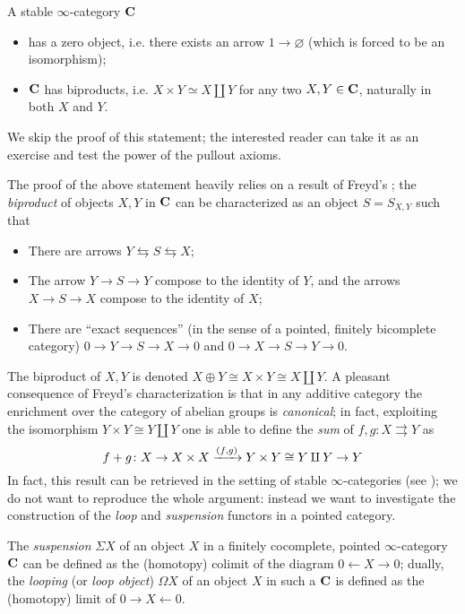 \begin{remark}
A stable $\infty$\hyp{}category $\mathbf{C}$
\begin{itemize}
\item has a zero object, i.e. there exists an arrow $1\to\varnothing$ (which is forced to be an isomorphism);
\item $\mathbf{C}$ has biproducts, i.e. $X\times Y\simeq X\amalg Y$ for any two $X,Y\in\mathbf{C}$, naturally in both $X$ and $Y$.
\end{itemize}
\end{remark}
We skip the proof of this statement; the interested reader can take it as an exercise and test the power of the pullout axioms.
\begin{remark}
The proof of the above statement heavily relies on a result of Freyd's \cite{freyd1964abelian}; the \emph{biproduct} of objects $X,Y$ in $\mathbf{C}$ can be characterized as an object $S = S_{X,Y}$ such that
\begin{itemize}
\item There are arrows $Y\leftrightarrows S\leftrightarrows X$;
\item The arrow $Y\to S\to Y$ compose to the identity of $Y$, and the arrows $X\to S\to X$ compose to the identity of $X$;
\item There are ``exact sequences'' (in the sense of a pointed, finitely bicomplete category) $0\to Y\to S\to X\to 0$ and $0\to X\to S\to Y\to 0$.
\end{itemize}
The biproduct of $X,Y$ is denoted $X\oplus Y\cong X\times Y\cong X\amalg Y$. A pleasant consequence of Freyd's characterization is that in any additive category the enrichment over the category of abelian groups is \emph{canonical}; in fact, exploiting the isomorphism $Y\times Y\cong Y\amalg Y$ one is able to define the \emph{sum} of $f,g\colon X\rightrightarrows Y$ as
\[
f+g\colon X\to X\times X \xrightarrow{(f,g)} Y\times Y\cong Y\amalg Y\to Y
\]
In fact, this result can be retrieved in the setting of stable $\infty$\hyp{}categories (see \cite[Lemma \textbf{1.1.2.9}]{LurieHA}); we do not want to reproduce the whole argument: instead we want to investigate the construction of the \emph{loop} and \emph{suspension} functors in a pointed category.
\end{remark}
The \emph{suspension} $\Sigma X$ of an object $X$ in a finitely cocomplete, pointed $\infty$\hyp{}category $\mathbf{C}$ can be defined as the (homotopy) colimit of the diagram $0\leftarrow X\to 0$; dually, the \emph{looping} (or \emph{loop object}) $\Omega X$ of an object $X$ in such a $\mathbf{C}$ is defined as the (homotopy) limit of $0\to X\leftarrow 0$.

